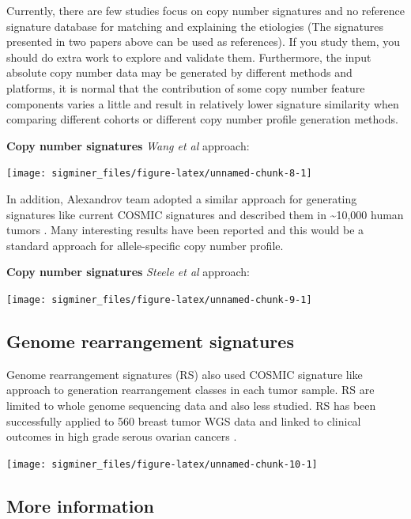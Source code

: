 \documentclass[
  12pt,
  a4paper,
  twoside]{book}
\begin{document}
Currently, there are few studies focus on copy number signatures and no reference signature database for matching and explaining the etiologies (The signatures presented in two papers above can be used as references). If you study them, you should do extra work to explore and validate them. Furthermore, the input absolute copy number data may be generated by different methods and platforms, it is normal that the contribution of some copy number feature components varies a little and result in relatively lower signature similarity when comparing different cohorts or different copy number profile generation methods.

\textbf{Copy number signatures} \emph{Wang et al} approach:

\texttt{[image: sigminer\_files/figure-latex/unnamed-chunk-8-1]}

In addition, Alexandrov team adopted a similar approach for generating signatures like current COSMIC signatures
and described them in \textasciitilde10,000 human tumors \citep{steele2021signatures}. Many interesting results have been reported and this
would be a standard approach for allele-specific copy number profile.

\textbf{Copy number signatures} \emph{Steele et al} approach:

\texttt{[image: sigminer\_files/figure-latex/unnamed-chunk-9-1]}

\hypertarget{genome-rearrangement-signatures}{%
\subsection{Genome rearrangement signatures}\label{genome-rearrangement-signatures}}

Genome rearrangement signatures (RS) also used COSMIC signature like approach to generation
rearrangement classes in each tumor sample.
RS are limited to whole genome sequencing data and also less studied.
RS has been successfully applied to 560 breast tumor WGS data \citep{nik2016landscape} and linked to clinical
outcomes in high grade serous ovarian cancers \citep{hillman2018genomic}.

\texttt{[image: sigminer\_files/figure-latex/unnamed-chunk-10-1]}

\hypertarget{more-information}{%
\subsection{More information}\label{more-information}}
\end{document}

